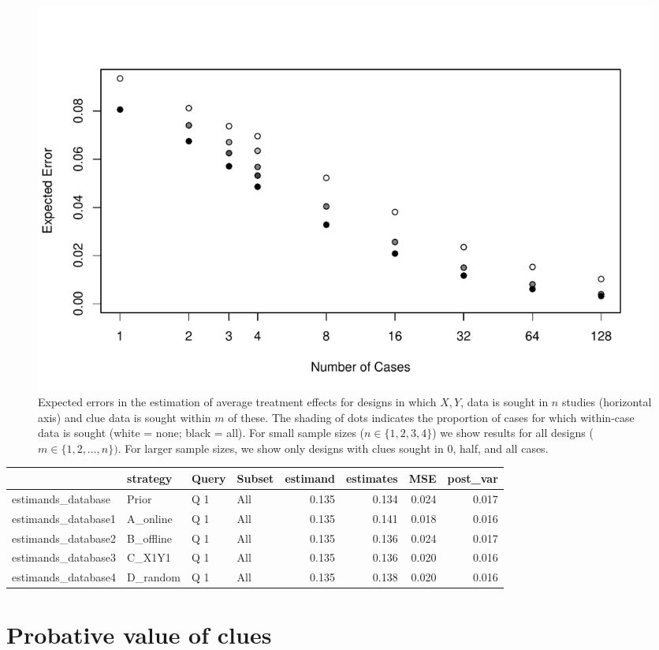 \documentclass[12pt,]{book}
\begin{document}
\begin{figure}[h!]
\centering
\includegraphics[width=\textwidth]{Figures/m_or_n.pdf}
\caption{{Expected errors in the estimation of average treatment effects for designs in which $X, Y$, data is sought in $n$ studies (horizontal axis) and clue data is sought within $m$ of these. The shading of dots indicates the proportion of cases for which within-case data is sought (white = none; black = all). For small sample sizes ($n \in \{1,2,3,4\}$) we show results for all designs ($m \in \{1,2,\dots, n\})$. For larger sample sizes, we show only designs with clues sought in 0, half, and all cases.}}
\label{morn}
\end{figure}

\begin{tabular}{l|l|l|l|r|r|r|r}
\hline
  & strategy & Query & Subset & estimand & estimates & MSE & post\_var\\
\hline
estimands\_database & Prior & Q 1 & All & 0.135 & 0.134 & 0.024 & 0.017\\
\hline
estimands\_database1 & A\_online & Q 1 & All & 0.135 & 0.141 & 0.018 & 0.016\\
\hline
estimands\_database2 & B\_offline & Q 1 & All & 0.135 & 0.136 & 0.024 & 0.017\\
\hline
estimands\_database3 & C\_X1Y1 & Q 1 & All & 0.135 & 0.136 & 0.020 & 0.016\\
\hline
estimands\_database4 & D\_random & Q 1 & All & 0.135 & 0.138 & 0.020 & 0.016\\
\hline
\end{tabular}

\hypertarget{probative-value-of-clues}{%
\section{Probative value of clues}\label{probative-value-of-clues}}
\end{document}
